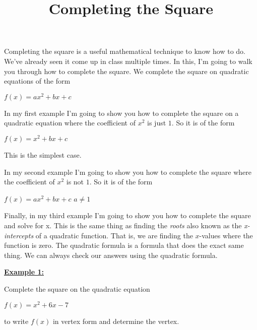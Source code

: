\documentclass[12pt]{article}
\newenvironment{myindentpar}[1]%
     {\begin{list}{}%
             {\setlength{\leftmargin}{#1}}%
             \item[]%
     }
     {\end{list}}
\begin{document}
\title{Completing the Square}
\date{}
\author{}
\maketitle


Completing the square is a useful mathematical technique to know how to do. We've already seen it come up in class multiple times. In this, I'm going to walk you through how to complete the square.
We complete the square on quadratic equations of the form
\newline

\centerline{$f(x)= ax^2 + bx + c$}
\vspace{.5cm}

In my first example I'm going to show you how to complete the square on a quadratic equation where the coefficient of $x^2$ is just $1$. So it is of the form
\newline

\centerline{$f(x)= x^2 + bx + c$}
\vspace{.5cm}

This is the simplest case.

In my second example I'm going to show you how to complete the square where the coefficient of $x^2$ is not $1$. So it is of the form
\newline

\centerline{$f(x)= ax^2 + bx + c$ \hspace{2cm} $a \neq 1$}
\vspace{.5cm}

Finally, in my third example I'm going to show you how to complete the square and solve for x. This is the same thing as finding the \textit{roots} also known as the \textit{x-intercepts} of a quadratic function. That is, we are finding the $x$-values where the function is zero. The quadratic formula is a formula that does the exact same thing. We can always check our answers using the quadratic formula.
\newline

{\bf \underline{Example 1:}} \begin{myindentpar}{1cm} Complete the square on the quadratic equation
\newline

\centerline{$f(x)= x^2 +6x - 7$}

to write $f(x)$ in vertex form and determine the vertex. 

\end{myindentpar}
\end{document}
